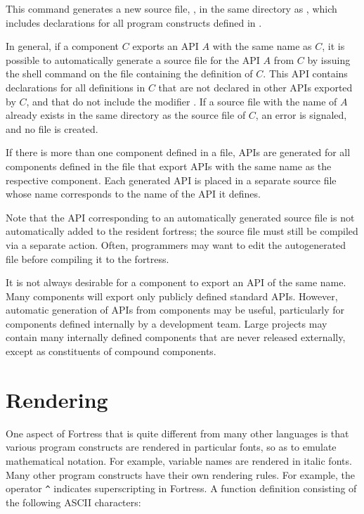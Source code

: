 
This command generates a new source file, , in the
same directory as , which includes declarations for
all program constructs defined in .

In general, if a component $C$ exports an API $A$ with the same name as $C$,
it is possible to automatically generate a source file
for the API $A$ from $C$
by issuing the shell command  on the file
containing the definition of $C$.
This API contains declarations for all definitions in $C$ that are not
declared in other APIs exported by $C$, and that do not include
the modifier .
If a source file with the name of $A$ already exists in the
same directory as the source file of $C$, an error is signaled,
and no file is created.

If there is more than one component defined in a file,
APIs are generated for all components defined in the file that
export APIs with the same name as the respective component.
Each generated API is placed in a separate source file whose
name corresponds to the name of the API it defines.

Note that the API corresponding to an automatically generated source
file is not automatically added to the resident fortress; the source
file must still be compiled via a separate action. Often, programmers
may want to edit the autogenerated file before compiling it to the
fortress.

It is not always desirable for a component to export an API of the same name.
Many components will export only publicly defined standard APIs.
However, automatic generation of APIs from components may be useful,
particularly for components defined internally by a development team.
Large projects may contain many internally defined components that
are never released externally,
except as constituents of compound components.

\section{Rendering}

One aspect of Fortress that is quite different from many other languages
is that various program constructs are rendered in particular fonts,
so as to emulate mathematical notation.
For example, variable names are rendered in italic fonts.
Many other program constructs have their own rendering rules. For
example, the operator \verb$^$ indicates superscripting in
Fortress.
A function definition consisting of the following ASCII characters:

